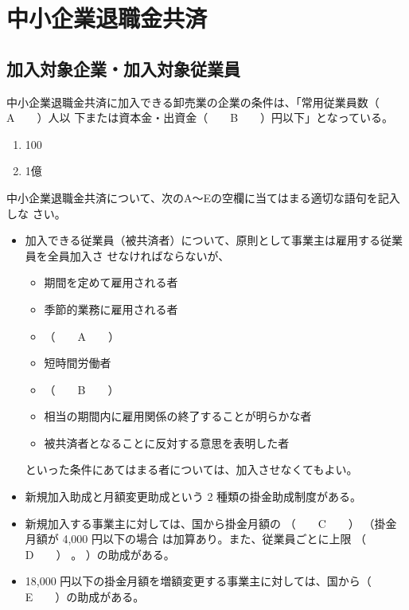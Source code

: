 \section{中小企業退職金共済}

\subsection{加入対象企業・加入対象従業員}

\begin{fillblank}[年金1 2019 問題1(4)\textcircled{3}]
中小企業退職金共済に加入できる卸売業の企業の条件は、「常用従業員数（　　A　　）人以
下または資本金・出資金（　　B　　）円以下」となっている。
\end{fillblank}

\begin{answerbox}
  \begin{enumerate}[A:]
    \item 100
    \item 1億
  \end{enumerate}
\end{answerbox}

\begin{fillblank}[年金1 H28 問題1(3)]
  中小企業退職金共済について、次のA〜Eの空欄に当てはまる適切な語句を記入しな
さい。

  \begin{itemize}
    \item 加入できる従業員（被共済者）について、原則として事業主は雇用する従業員を全員加入さ
せなければならないが、
    \begin{itemize}
      \item 期間を定めて雇用される者
      \item 季節的業務に雇用される者
      \item （　　A　　）
      \item 短時間労働者
      \item （　　B　　）
      \item 相当の期間内に雇用関係の終了することが明らかな者
      \item 被共済者となることに反対する意思を表明した者
    \end{itemize}
といった条件にあてはまる者については、加入させなくてもよい。

    \item 新規加入助成と月額変更助成という 2 種類の掛金助成制度がある。
    \item 新規加入する事業主に対しては、国から掛金月額の （　　C　　） （掛金月額が 4,000 円以下の場合
    は加算あり。また、従業員ごとに上限 （　　D　　） 。 ）の助成がある。
    \item 18,000 円以下の掛金月額を増額変更する事業主に対しては、国から（　　E　　）の助成がある。
  \end{itemize}

\end{fillblank}

